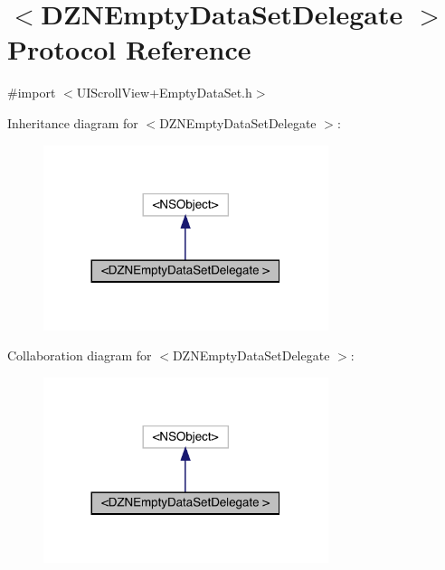 \hypertarget{protocol_d_z_n_empty_data_set_delegate_01-p}{}\section{$<$D\+Z\+N\+Empty\+Data\+Set\+Delegate $>$ Protocol Reference}
\label{protocol_d_z_n_empty_data_set_delegate_01-p}


{\ttfamily \#import $<$U\+I\+Scroll\+View+\+Empty\+Data\+Set.\+h$>$}



Inheritance diagram for $<$D\+Z\+N\+Empty\+Data\+Set\+Delegate $>$\+:\nopagebreak
\begin{figure}[H]
\begin{center}
\leavevmode
\includegraphics[width=236pt]{protocol_d_z_n_empty_data_set_delegate_01-p__inherit__graph}
\end{center}
\end{figure}


Collaboration diagram for $<$D\+Z\+N\+Empty\+Data\+Set\+Delegate $>$\+:\nopagebreak
\begin{figure}[H]
\begin{center}
\leavevmode
\includegraphics[width=236pt]{protocol_d_z_n_empty_data_set_delegate_01-p__coll__graph}
\end{center}
\end{figure}
